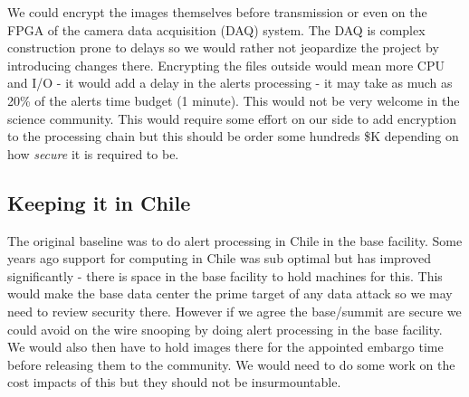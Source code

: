 We could encrypt the images themselves before transmission or even on the FPGA of the camera data acquisition (DAQ) system.  The DAQ is complex construction prone to delays so we would rather not jeopardize the project by introducing changes there. Encrypting the files outside would mean more CPU and I/O - it would add a delay in the alerts processing - it may take as much as 20\% of the alerts time budget (1 minute).  This would not be very welcome in the science community. This would require some effort on our side to add encryption to the processing chain but this should be order some hundreds \$K depending on how \emph{secure} it is required to be.



\subsection{Keeping it in Chile}\label{sec:chile}
The original baseline was to do alert processing in Chile in the base facility. Some years ago support for computing in Chile was sub optimal but has improved significantly - there is space in the base facility to hold machines for this.
This would make the base data center the prime target of any data  attack so we may need to review security there.
However if we agree the base/summit are secure we could avoid on the wire snooping by doing alert processing in the base facility. We would also then have to hold images there for the appointed embargo time  before releasing them to the community. We would need to do some work on the cost impacts of this but they should not be insurmountable.
